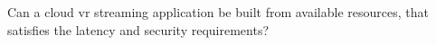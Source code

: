  Can a cloud \acrfull{vr} streaming application be built from available resources, that satisfies the latency and security requirements?